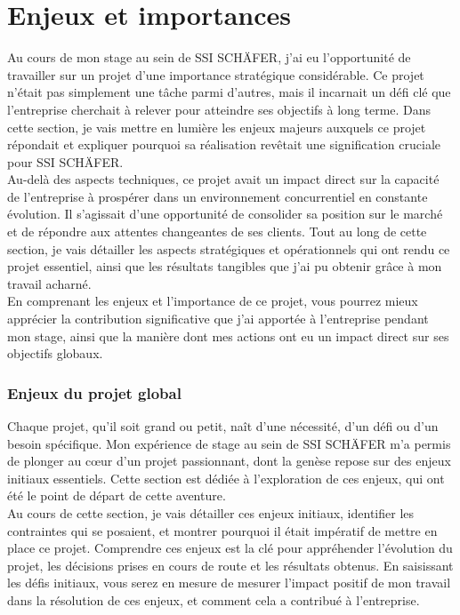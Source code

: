 \documentclass[a4paper, 12pt, french]{article}
\begin{document}
		\newpage
		
		\part{Enjeux et importances}
			Au cours de mon stage au sein de SSI SCHÄFER, j'ai eu l'opportunité de travailler sur un projet d'une importance stratégique considérable. Ce projet n'était pas simplement une tâche parmi d'autres, mais il incarnait un défi clé que l'entreprise cherchait à relever pour atteindre ses objectifs à long terme. Dans cette section, je vais mettre en lumière les enjeux majeurs auxquels ce projet répondait et expliquer pourquoi sa réalisation revêtait une signification cruciale pour SSI SCHÄFER.\\

			Au-delà des aspects techniques, ce projet avait un impact direct sur la capacité de l'entreprise à prospérer dans un environnement concurrentiel en constante évolution. Il s'agissait d'une opportunité de consolider sa position sur le marché et de répondre aux attentes changeantes de ses clients. Tout au long de cette section, je vais détailler les aspects stratégiques et opérationnels qui ont rendu ce projet essentiel, ainsi que les résultats tangibles que j'ai pu obtenir grâce à mon travail acharné.\\

			En comprenant les enjeux et l'importance de ce projet, vous pourrez mieux apprécier la contribution significative que j'ai apportée à l'entreprise pendant mon stage, ainsi que la manière dont mes actions ont eu un impact direct sur ses objectifs globaux.
				
			\section{Enjeux du projet global}
				Chaque projet, qu'il soit grand ou petit, naît d'une nécessité, d'un défi ou d'un besoin spécifique. Mon expérience de stage au sein de SSI SCHÄFER m'a permis de plonger au c\oe ur d'un projet passionnant, dont la genèse repose sur des enjeux initiaux essentiels. Cette section est dédiée à l'exploration de ces enjeux, qui ont été le point de départ de cette aventure.\\

				Au cours de cette section, je vais détailler ces enjeux initiaux, identifier les contraintes qui se posaient, et montrer pourquoi il était impératif de mettre en place ce projet. Comprendre ces enjeux est la clé pour appréhender l'évolution du projet, les décisions prises en cours de route et les résultats obtenus. En saisissant les défis initiaux, vous serez en mesure de mesurer l'impact positif de mon travail dans la résolution de ces enjeux, et comment cela a contribué à l'entreprise.\\
\end{document}
